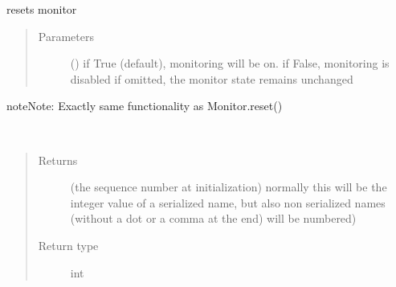 \documentclass[letterpaper,10pt,english]{sphinxmanual}
\begin{document}
\begin{fulllineitems}
\begin{fulllineitems}
\begin{quote}
\begin{description}
\end{description}\end{quote}

\end{fulllineitems}


\begin{fulllineitems}
\label{\detokenize{Reference:salabim.Monitor.reset_monitors}}
resets monitor
\begin{quote}\begin{description}
\item[{Parameters}] \leavevmode
{} () \textendash{} if True (default), monitoring will be on. 
if False, monitoring is disabled 
if omitted, the monitor state remains unchanged

\end{description}\end{quote}

\begin{sphinxadmonition}{note}{Note:}
Exactly same functionality as Monitor.reset()
\end{sphinxadmonition}

\end{fulllineitems}


\begin{fulllineitems}
\label{\detokenize{Reference:salabim.Monitor.sequence_number}}~\begin{quote}\begin{description}
\item[{Returns}] \leavevmode
{} \textendash{} (the sequence number at initialization) 
normally this will be the integer value of a serialized name,
but also non serialized names (without a dot or a comma at the end)
will be numbered)

\item[{Return type}] \leavevmode
int

\end{description}\end{quote}

\end{fulllineitems}


\end{fulllineitems}
\end{document}
